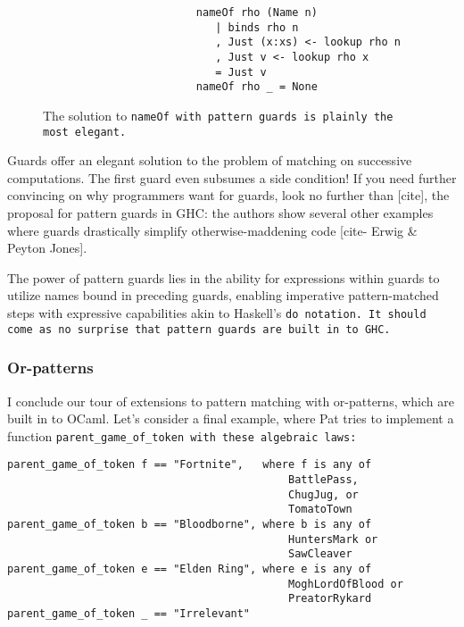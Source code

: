 \documentclass[manuscript,screen,review, 12pt]{acmart}
\begin{document}
    \begin{figure}[hbt!]  
        \begin{center}
        \begin{verbatim}
                        nameOf rho (Name n)
                           | binds rho n 
                           , Just (x:xs) <- lookup rho n
                           , Just v <- lookup rho x
                           = Just v
                        nameOf rho _ = None
        \end{verbatim}
        \end{center}    
    \caption{The solution to \tt{nameOf} with pattern guards is plainly the most
    elegant.} 
    \label{fig:guardnameof}
    \end{figure}

    Guards offer an elegant solution to the problem of matching on successive
    computations. The first guard even subsumes a side condition! If you need
    further convincing on why programmers want for guards, look no further than
    [cite], the proposal for pattern guards in GHC: the authors show several
    other examples where guards drastically simplify otherwise-maddening code
    [cite- Erwig \& Peyton Jones]. 
    
    The power of pattern guards lies in the ability for expressions within
    guards to utilize names bound in preceding guards, enabling imperative
    pattern-matched steps with expressive capabilities akin to Haskell's \tt{do}
    notation. It should come as no surprise that pattern guards are built in to
    GHC. 

        

\subsubsection{Or-patterns}

        I conclude our tour of extensions to pattern matching with or-patterns,
        which are built in to OCaml. Let's consider a final example, where Pat
        tries to implement a function \tt{parent\_game\_of\_token} with these 
        algebraic laws: 

        \begin{minipage}[t]{\textwidth}
            \centering 
            \begin{verbatim}
parent_game_of_token f == "Fortnite",   where f is any of 
                                            BattlePass, 
                                            ChugJug, or
                                            TomatoTown
parent_game_of_token b == "Bloodborne", where b is any of 
                                            HuntersMark or 
                                            SawCleaver
parent_game_of_token e == "Elden Ring", where e is any of 
                                            MoghLordOfBlood or  
                                            PreatorRykard 
parent_game_of_token _ == "Irrelevant"
                                        \end{verbatim}
        \end{minipage}
    
\end{document}
